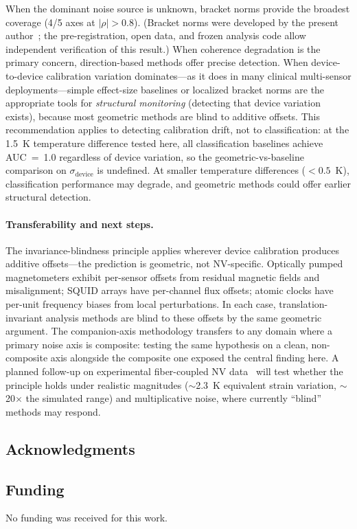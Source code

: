 \documentclass[11pt]{article}
\providecommand{\ack}[1]{\subsection*{Acknowledgments}#1}
\providecommand{\funding}[1]{\subsection*{Funding}#1}
\begin{document}
When the dominant noise source is unknown, bracket norms provide the
broadest coverage (4/5 axes at $|\rho| > 0.8$).  (Bracket norms were
developed by the present author~\citep{tower2026bracket}; the
pre-registration, open data, and frozen analysis code allow independent
verification of this result.)  When coherence
degradation is the primary concern, direction-based methods offer
precise detection.  When device-to-device calibration variation
dominates---as it does in many clinical multi-sensor
deployments---simple effect-size baselines or localized bracket norms
are the appropriate tools for \emph{structural monitoring} (detecting
that device variation exists), because most geometric methods are blind
to additive offsets.  This recommendation applies to detecting
calibration drift, not to classification: at the 1.5~K temperature
difference tested here, all classification baselines achieve AUC~=~1.0
regardless of device variation, so the geometric-vs-baseline comparison
on $\sigma_\text{device}$ is undefined.  At smaller temperature
differences ($< 0.5$~K), classification performance may degrade, and
geometric methods could offer earlier structural detection.

\paragraph{Transferability and next steps.}
The invariance-blindness principle applies wherever device calibration
produces additive offsets---the prediction is geometric, not
NV-specific.  Optically pumped magnetometers exhibit per-sensor offsets
from residual magnetic fields and misalignment; SQUID arrays have
per-channel flux offsets; atomic clocks have per-unit frequency biases
from local perturbations.  In each case, translation-invariant analysis
methods are blind to these offsets by the same geometric argument.
The companion-axis methodology transfers to any domain where a primary
noise axis is composite: testing the same hypothesis on a clean,
non-composite axis alongside the composite one exposed the central
finding here.  A planned follow-up on experimental fiber-coupled
NV data~\citep{rajpal2025evaluating} will test whether the principle
holds under realistic magnitudes ($\sim$2.3~K equivalent strain
variation, $\sim$20$\times$ the simulated range) and multiplicative
noise, where currently ``blind'' methods may respond.

\ack{}

\funding{No funding was received for this work.}
\end{document}

